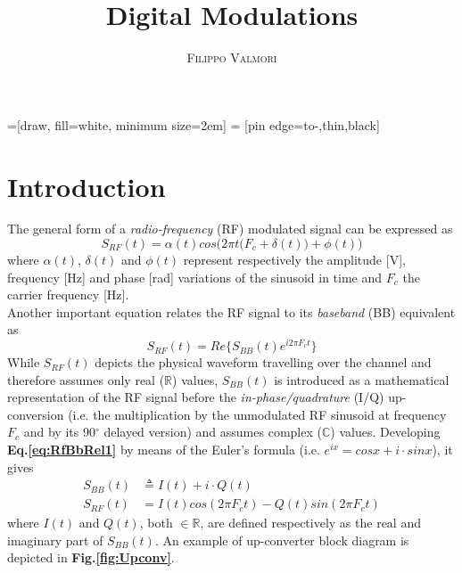 \documentclass[twoside,twocolumn]{article}
\title{Digital Modulations} %
\author{%
\textsc{Filippo Valmori} \\ %
}
\date{} %
\begin{document}
=[draw, fill=white, minimum size=2em]
 = [pin edge={to-,thin,black}]


\maketitle


\section{Introduction}
The general form of a \textit{radio-frequency} (RF) modulated signal can be expressed as
\begin{equation} \label{eq:GenRfMod}
S_{\mathit{RF}}(t) = \alpha(t)cos\Big(2\pi t\big(F_c+\delta(t)\big)+\phi(t)\Big)
\end{equation}
 where $\alpha(t)$, $\delta(t)$ and $\phi(t)$ represent respectively the amplitude [V], frequency [Hz] and phase [rad] variations of the sinusoid in time and $F_c$ the carrier frequency [Hz].\\ %
Another important equation relates the RF signal to its \textit{baseband} (BB) equivalent as
\begin{equation} \label{eq:RfBbRel1}
S_{\mathit{RF}}(t) = Re \Big\{ S_{\mathit{BB}}(t)e^{i2\pi F_ct} \Big\}
\end{equation}
While $S_{\mathit{RF}}(t)$ depicts the physical waveform travelling over the channel and therefore assumes only real ($\mathbb{R}$) values, $S_{\mathit{BB}}(t)$ is introduced as a mathematical representation of the RF signal before the \textit{in-phase/quadrature} (I/Q) up-conversion (i.e. the multiplication by the unmodulated RF sinusoid at frequency $F_c$ and by its 90$^\circ$ delayed version) and assumes complex ($\mathbb{C}$) values. Developing \textbf{Eq.\ref{eq:RfBbRel1}} by means of the Euler's formula (i.e. $e^{ix} = cos x+i\cdot sin x$), it gives
\begin{align}
S_{\mathit{BB}}(t) &\triangleq I(t) +i \cdot Q(t) \label{eq:RfBbRel2} \\
S_{\mathit{RF}}(t) &= I(t)cos(2\pi F_ct)-Q(t)sin(2\pi F_ct) \nonumber
\end{align}
where $I(t)$ and $Q(t)$, both $\in \mathbb{R}$, are defined respectively as the real and imaginary part of $S_{\mathit{BB}}(t)$. An example of up-converter block diagram is depicted in \textbf{Fig.\ref{fig:Upconv}}.
\end{document}

